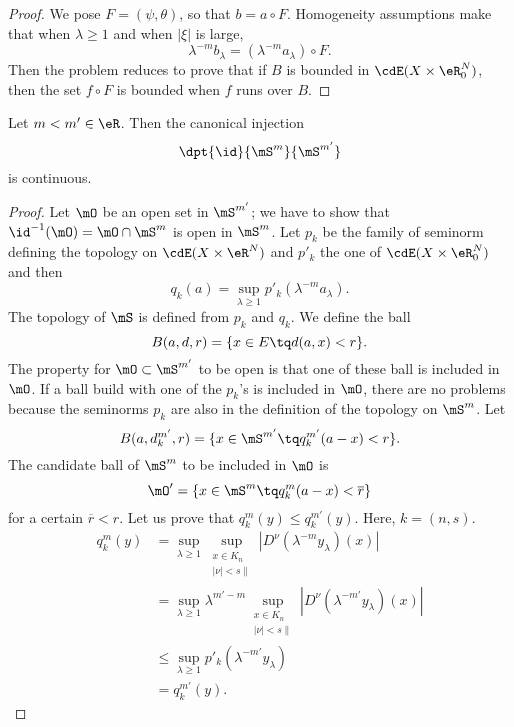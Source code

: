\begin{proof}
	We pose $F=(\psi,\theta)$, so that $b=a\circ F$. Homogeneity assumptions make that when $\lambda\geq 1$ and when $|\xi|$ is large,
	\[
		\lambda^{-m}b_{\lambda}=(\lambda^{-m}a_{\lambda})\circ F.
	\]
	Then the problem reduces to prove that if $B$ is bounded in $\cdE(X\times\eR^N_0)$, then the set $f\circ F$ is bounded when $f$ runs over $B$.
\end{proof}


\begin{lemma}
	Let $m<m'\in\eR$. Then the canonical injection
	\[
		\dpt{\id}{\mS^m}{\mS^{m'}}
	\]
	is continuous.

\end{lemma}


\begin{proof}
	Let $\mO$ be an open set in $\mS^{m'}$; we have to show that $\id^{-1}(\mO)=\mO\cap\mS^{m}$ is open in $\mS^m$. Let $p_k$ be the family of seminorm defining the topology on $\cdE(X\times\eR^N)$ and $p'_k$ the one of $\cdE(X\times\eR^N_0)$ and then
	\[
		q_k(a)=\sup_{\lambda\geq 1}p'_k(\lambda^{-m}a_{\lambda}).
	\]
	The topology of $\mS$ is defined from $p_k$ and $q_k$. We define the ball
	\[
		B(a,d,r)=\{x\in E\tq d(a,x)<r\}.
	\]
	The property for $\mO\subset\mS^{m'}$ to be open is that one of these ball is included in $\mO$. If a ball build with one of the $p_k$'s is included in $\mO$, there are no problems because the seminorms $p_k$ are also in the definition of the topology on $\mS^m$. Let
	\[
		B(a,d_k^{m'},r)=\{x\in\mS^{m'}\tq q_k^{m'}(a-x)<r\}.
	\]
	The candidate ball of $\mS^m$ to be included in $\mO$ is
	\[
		\mO'=\{x\in\mS^m\tq q_k^m(a-x)<\overline{r}\}
	\]
	for a certain $\overline{r}<r$. Let us prove that $q_k^m(y)\leq q_k^{m'}(y)$. Here, $k=(n,s)$.
	\begin{equation}
		\begin{split}
			q_k^m(y)&=\sup_{\lambda\geq 1}\sup_{\substack{x\in K_n\\|\nu|<s\|}}| D^{\nu}(\lambda^{-m}y_{\lambda})(x) |\\
			&=\sup_{\lambda\geq 1}\lambda^{m'-m}\sup_{\substack{x\in K_n\\|\nu|<s\|}}| D^{\nu}(\lambda^{-m'}y_{\lambda})(x) |\\
			&\leq\sup_{\lambda\geq 1}p'_k(\lambda^{-m'}y_{\lambda})\\
			&=q_k^{m'}(y).
		\end{split}
	\end{equation}

\end{proof}

